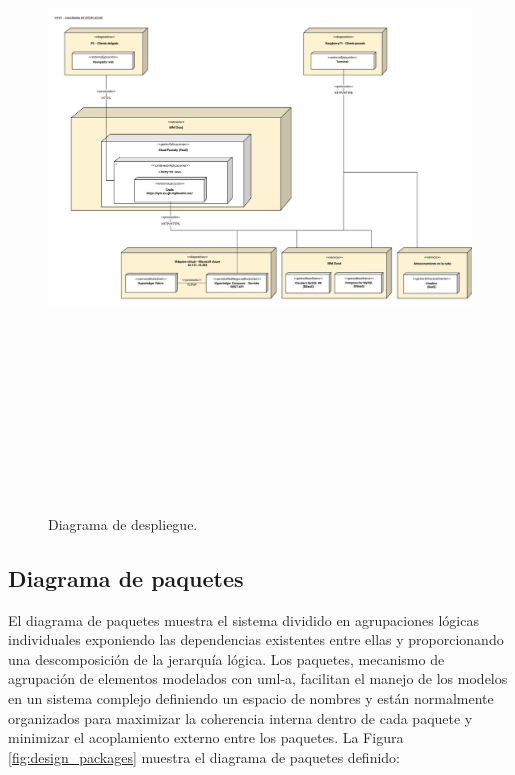 \documentclass[12pt,a4paper, twoside]{report}
\begin{document}
	\begin{figure}[!ht]   
		\caption{Diagrama de despliegue.} 
		\begin{center} 
			\includegraphics[width=17cm,height=18cm]{Images/design/d_deployment.png} \\
			\label{fig:design_deployment} 
		\end{center}  
	\end{figure}	

	\subsection{Diagrama de paquetes}
	
	El diagrama de paquetes muestra el sistema dividido en agrupaciones lógicas individuales exponiendo las dependencias existentes entre ellas y proporcionando una descomposición de la jerarquía lógica. Los paquetes, mecanismo de agrupación de elementos modelados con \gls{uml-a}, facilitan el manejo de los modelos en un sistema complejo definiendo un espacio de nombres y están normalmente organizados para maximizar la coherencia interna dentro de cada paquete y minimizar el acoplamiento externo entre los paquetes. La Figura \ref{fig:design_packages} muestra el diagrama de paquetes definido:
	
\end{document}
